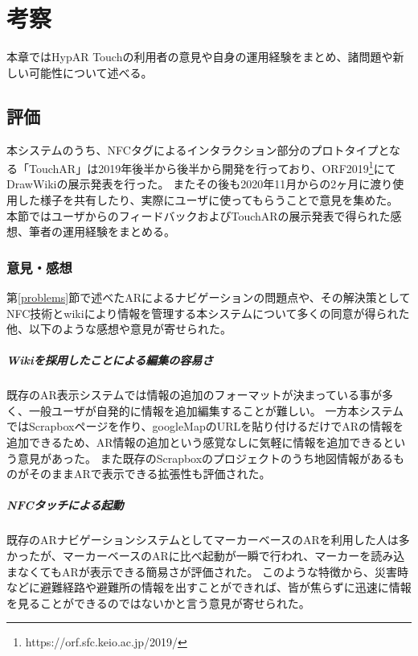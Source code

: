 \chapter{考察}
\label{chap:consideration}

本章ではHypAR Touchの利用者の意見や自身の運用経験をまとめ、諸問題や新しい可能性について述べる。

\newpage


\section{評価}
本システムのうち、NFCタグによるインタラクション部分のプロトタイプとなる「TouchAR」は2019年後半から後半から開発を行っており、ORF2019\footnote{ \textsf{https://orf.sfc.keio.ac.jp/2019/} }にてDrawWikiの展示発表を行った。
またその後も2020年11月からの2ヶ月に渡り使用した様子を共有したり、実際にユーザに使ってもらうことで意見を集めた。
本節ではユーザからのフィードバックおよびTouchARの展示発表で得られた感想、筆者の運用経験をまとめる。

\subsection{意見・感想}

第\ref{problems}節で述べたARによるナビゲーションの問題点や、その解決策としてNFC技術とwikiにより情報を管理する本システムについて多くの同意が得られた他、以下のような感想や意見が寄せられた。

\paragraph*{Wikiを採用したことによる編集の容易さ}
既存のAR表示システムでは情報の追加のフォーマットが決まっている事が多く、一般ユーザが自発的に情報を追加編集することが難しい。
一方本システムではScrapboxページを作り、googleMapのURLを貼り付けるだけでARの情報を追加できるため、AR情報の追加という感覚なしに気軽に情報を追加できるという意見があった。
また既存のScrapboxのプロジェクトのうち地図情報があるものがそのままARで表示できる拡張性も評価された。

\paragraph*{NFCタッチによる起動}
既存のARナビゲーションシステムとしてマーカーベースのARを利用した人は多かったが、マーカーベースのARに比べ起動が一瞬で行われ、マーカーを読み込まなくてもARが表示できる簡易さが評価された。
このような特徴から、災害時などに避難経路や避難所の情報を出すことができれば、皆が焦らずに迅速に情報を見ることができるのではないかと言う意見が寄せられた。


